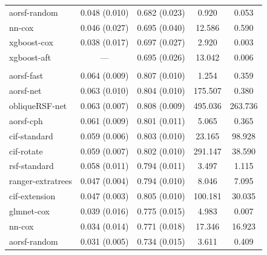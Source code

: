 \documentclass[twoside,11pt]{article}\usepackage[]{graphicx}\usepackage[]{xcolor}
\newenvironment{knitrout}{}{} %
\begin{document}
\begin{knitrout}
\begin{longtable}[t]{lcccc}
\hspace{1em}aorsf-random & 0.048 (0.010) & 0.682 (0.023) & 0.920 & 0.053\\
\hspace{1em}nn-cox & 0.046 (0.027) & 0.695 (0.040) & 12.586 & 0.590\\
\hspace{1em}xgboost-cox & 0.038 (0.017) & 0.697 (0.027) & 2.920 & 0.003\\
\hspace{1em}xgboost-aft & --- & 0.695 (0.026) & 13.042 & 0.006\\
\addlinespace[0.3em]
\multicolumn{5}{l}{\textit{\textbf{MESA; coronary heart disease, n = 6785, p = 48}}}\\
\hline
\hspace{1em}aorsf-fast & 0.064 (0.009) & 0.807 (0.010) & 1.254 & 0.359\\
\hspace{1em}aorsf-net & 0.063 (0.010) & 0.804 (0.010) & 175.507 & 0.380\\
\hspace{1em}obliqueRSF-net & 0.063 (0.007) & 0.808 (0.009) & 495.036 & 263.736\\
\hspace{1em}aorsf-cph & 0.061 (0.009) & 0.801 (0.011) & 5.065 & 0.365\\
\hspace{1em}cif-standard & 0.059 (0.006) & 0.803 (0.010) & 23.165 & 98.928\\
\hspace{1em}cif-rotate & 0.059 (0.007) & 0.802 (0.010) & 291.147 & 38.590\\
\hspace{1em}rsf-standard & 0.058 (0.011) & 0.794 (0.011) & 3.497 & 1.115\\
\hspace{1em}ranger-extratrees & 0.047 (0.004) & 0.794 (0.010) & 8.046 & 7.095\\
\hspace{1em}cif-extension & 0.047 (0.003) & 0.805 (0.010) & 100.181 & 30.035\\
\hspace{1em}glmnet-cox & 0.039 (0.016) & 0.775 (0.015) & 4.983 & 0.007\\
\hspace{1em}nn-cox & 0.034 (0.014) & 0.771 (0.018) & 17.346 & 16.923\\
\hspace{1em}aorsf-random & 0.031 (0.005) & 0.734 (0.015) & 3.611 & 0.409\\

\end{longtable}
\end{knitrout}
\end{document}
